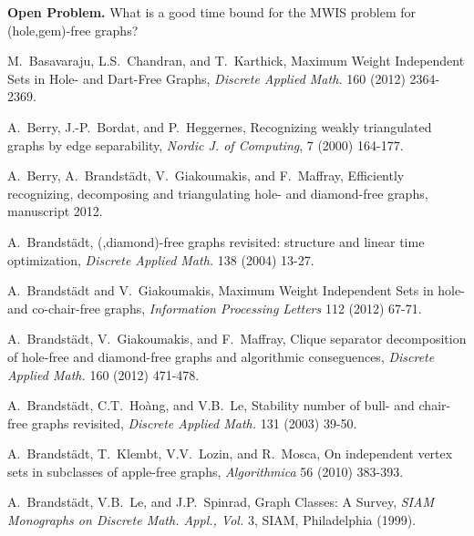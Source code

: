 \documentclass[11pt]{article}
\newcommand{\0}{\text{ has a co-join to }}
\newcommand{\1}{\text{ has a join to }}
\begin{document}
\medskip

\noindent
{\bf Open Problem.} What is a good time bound for the MWIS problem for (hole,gem)-free graphs?




\begin{footnotesize}
\renewcommand{\baselinestretch}{0.4}

\begin{thebibliography}{99}

    M.~Basavaraju, L.S.~Chandran, and T.~Karthick,
    Maximum Weight Independent Sets in Hole- and Dart-Free Graphs,
    {\sl Discrete Applied Math.} 160 (2012) 2364-2369.

    A.~Berry, J.-P.~Bordat, and P.~Heggernes, 
    Recognizing weakly triangulated graphs by edge separability,  
    {\em Nordic J. of Computing}, 7 (2000) 164-177.

    A.~Berry, A.~Brandst\"adt, V.~Giakoumakis, and F.~Maffray, 
    Efficiently recognizing, decomposing and triangulating hole- and diamond-free graphs,
    manuscript 2012.
    
    A.~Brandst\"adt, 
    (,diamond)-free graphs revisited: structure and linear time optimization,
    {\sl Discrete Applied Math.} 138 (2004) 13-27.
    
    A.~Brandst\"adt and V.~Giakoumakis,
    Maximum Weight Independent Sets in hole- and co-chair-free graphs,
    {\sl Information Processing Letters} 112 (2012) 67-71.

    A.~Brandst\"adt, V.~Giakoumakis, and F.~Maffray, 
    Clique separator decomposition of hole-free and diamond-free graphs and algorithmic conseguences,
    {\sl Discrete Applied Math.} 160 (2012) 471-478.

    A.~Brandst\"adt, C.T.~Ho\`ang, and V.B.~Le, 
    Stability number of bull- and chair-free graphs revisited,
    {\sl Discrete Applied Math.} 131 (2003) 39-50.

    A.~Brandst\"adt, T.~Klembt, V.V.~Lozin, and R.~Mosca,
    On independent vertex sets in subclasses of apple-free graphs,
    {\sl Algorithmica} 56 (2010) 383-393.

    A.~Brandst\"adt, V.B.~Le, and J.P.~Spinrad,
    Graph Classes: A Survey,
    {\sl SIAM Monographs on Discrete Math. Appl., Vol.} 3,
    SIAM, Philadelphia (1999).


\end{thebibliography}
\end{footnotesize}
\end{document}
